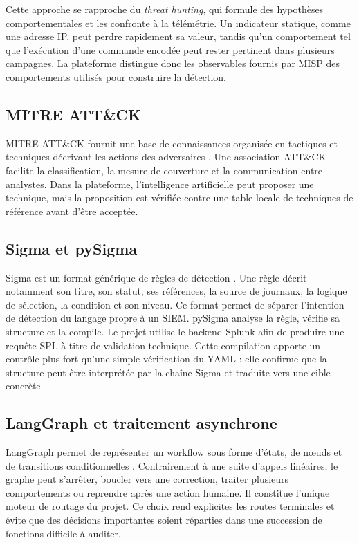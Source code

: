 Cette approche se rapproche du \textit{threat hunting}, qui formule des hypothèses comportementales et les confronte à la télémétrie. Un indicateur statique, comme une adresse IP, peut perdre rapidement sa valeur, tandis qu'un comportement tel que l'exécution d'une commande encodée peut rester pertinent dans plusieurs campagnes. La plateforme distingue donc les observables fournis par MISP des comportements utilisés pour construire la détection.

\subsection{MITRE ATT\&CK}

MITRE ATT\&CK fournit une base de connaissances organisée en tactiques et techniques décrivant les actions des adversaires \cite{mitreattack}. Une association ATT\&CK facilite la classification, la mesure de couverture et la communication entre analystes. Dans la plateforme, l'intelligence artificielle peut proposer une technique, mais la proposition est vérifiée contre une table locale de techniques de référence avant d'être acceptée.

\subsection{Sigma et pySigma}

Sigma est un format générique de règles de détection \cite{sigma}. Une règle décrit notamment son titre, son statut, ses références, la source de journaux, la logique de sélection, la condition et son niveau. Ce format permet de séparer l'intention de détection du langage propre à un SIEM. pySigma analyse la règle, vérifie sa structure et la compile. Le projet utilise le backend Splunk afin de produire une requête SPL à titre de validation technique. Cette compilation apporte un contrôle plus fort qu'une simple vérification du YAML : elle confirme que la structure peut être interprétée par la chaîne Sigma et traduite vers une cible concrète.

\subsection{LangGraph et traitement asynchrone}

LangGraph permet de représenter un workflow sous forme d'états, de nœuds et de transitions conditionnelles \cite{langgraph}. Contrairement à une suite d'appels linéaires, le graphe peut s'arrêter, boucler vers une correction, traiter plusieurs comportements ou reprendre après une action humaine. Il constitue l'unique moteur de routage du projet. Ce choix rend explicites les routes terminales et évite que des décisions importantes soient réparties dans une succession de fonctions difficile à auditer.

